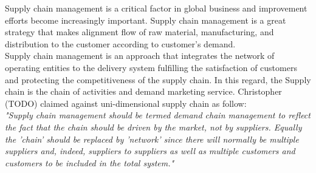 Supply chain management is a critical factor in global business and improvement efforts become increasingly important. Supply chain management is a great strategy that makes alignment flow of raw material, manufacturing, and distribution to the customer according to customer's demand. \\
Supply chain management is an approach that integrates the network of operating entities to the delivery system fulfilling the satisfaction of customers and protecting the competitiveness of the supply chain. 
In this regard, the Supply chain is the chain of activities and demand marketing service\cite{Kemal}. Christopher (TODO) claimed against uni-dimensional supply chain as follow:\\
\textit{"Supply chain management should be termed demand chain management to reflect the fact that the
	chain should be driven by the market, not by suppliers. Equally the 'chain' should be replaced by
	'network' since there will normally be multiple suppliers and, indeed, suppliers to suppliers as well as
	multiple customers and customers to be included in the total system."}
